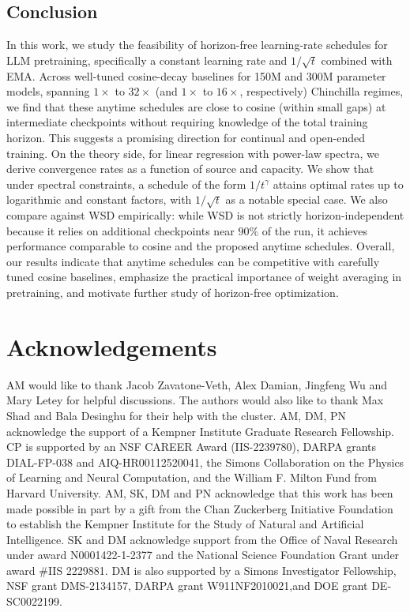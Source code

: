 \documentclass{article}
\theoremstyle{plain}
\begin{document}
\subsection{Conclusion} In this work, we study the feasibility of horizon-free learning-rate schedules for LLM pretraining, specifically a constant learning rate and $1/\sqrt{t}$ combined with EMA. Across well-tuned cosine-decay baselines for 150M and 300M parameter models, spanning $1\times$ to $32\times$ (and $1\times$ to $16\times$, respectively) Chinchilla regimes, we find that these anytime schedules are close to cosine (within small gaps) at intermediate checkpoints without requiring knowledge of the total training horizon. This suggests a promising direction for continual and open-ended training.
On the theory side, for linear regression with power-law spectra, we derive convergence rates as a function of source and capacity. We show that under spectral constraints, a schedule of the form $1/t^\gamma$ attains optimal rates up to logarithmic and constant factors, with $1/\sqrt{t}$ as a notable special case. We also compare against WSD empirically: while WSD is not strictly horizon-independent because it relies on additional checkpoints near $90\%$ of the run, it achieves performance comparable to cosine and the proposed anytime schedules. Overall, our results indicate that anytime schedules can be competitive with carefully tuned cosine baselines, emphasize the practical importance of weight averaging in pretraining, and motivate further study of horizon-free optimization.


\section*{Acknowledgements}
AM would like to thank Jacob Zavatone-Veth, Alex Damian, Jingfeng Wu and Mary Letey for helpful discussions. The authors would also like to thank Max Shad and Bala Desinghu for their help with the cluster. AM, DM, PN acknowledge the support of a Kempner Institute Graduate Research Fellowship. CP
is supported by an NSF CAREER Award (IIS-2239780), DARPA grants DIAL-FP-038 and AIQ-HR00112520041, the
Simons Collaboration on the Physics of Learning and Neural Computation, and the William F. Milton Fund from
Harvard University. AM, SK, DM and PN
acknowledge that this work has been made possible in part by a gift from the Chan Zuckerberg
Initiative Foundation to establish the Kempner Institute for the Study of Natural and Artificial
Intelligence. SK and DM acknowledge support from the Office of Naval Research under award N0001422-1-2377 and the National Science Foundation Grant under award \#IIS 2229881. DM is also supported by a Simons Investigator Fellowship, NSF grant DMS-2134157, DARPA grant W911NF2010021,and DOE grant DE-SC0022199.
\end{document}
